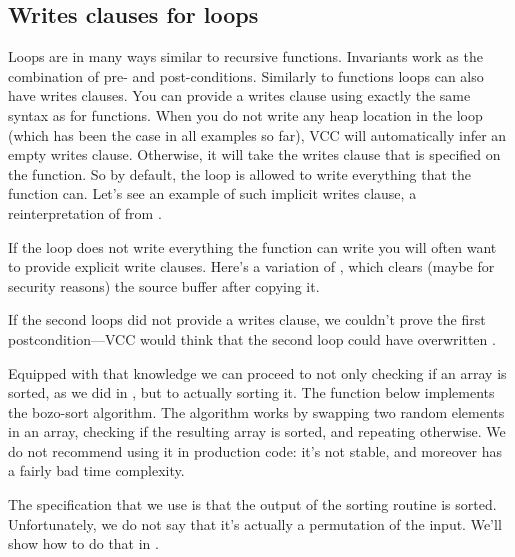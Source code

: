 \subsection{Writes clauses for loops}
\label{sect:sorting}

Loops are in many ways similar to recursive functions.
Invariants work as the combination of pre- and post-conditions.
Similarly to functions loops can also have writes clauses.
You can provide a writes clause using exactly the same syntax
as for functions.
When you do not write any heap location in the loop (which has been
the case in all examples so far), VCC will automatically infer
an empty writes clause.
Otherwise, it will take the writes clause that is specified on
the function.
So by default, the loop is allowed to write everything that the function
can.
Let's see an example of such implicit writes clause,
a reinterpretation of  from .


If the loop does not write everything the function can write
you will often want to provide explicit write clauses.
Here's a variation of , which clears (maybe for security reasons)
the source buffer after copying it.


\noindent
If the second loops did not provide a writes clause,
we couldn't prove the first postcondition---VCC 
would think that the second loop could have overwritten .

Equipped with that knowledge we can proceed to not only checking
if an array is sorted, as we did in , but to actually
sorting it.
The function below implements the bozo-sort algorithm.
The algorithm works by swapping two random elements in an array, checking if the resulting array
is sorted, and repeating otherwise.
We do not recommend using it in production code:
it's not stable, and moreover has a fairly bad time complexity.


The specification that we use is that the output of the sorting routine is sorted.
Unfortunately, we do not say that it's actually a permutation of the input.
We'll show how to do that in .



